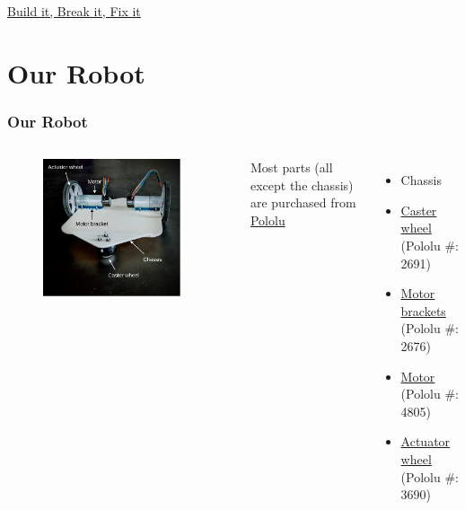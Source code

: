 \documentclass[12pt,letterpaper]{beamer}
\begin{document}
\begin{frame}{}
    \href{https://youtu.be/EezdinoG4mk}{Build it, Break it, Fix it}
    
\end{frame}

\section{Our Robot}

\begin{frame}
\frametitle{Our Robot}

\begin{columns}

\begin{figure}
    \includegraphics[width=0.9\textwidth]{3421bot}
\end{figure}

Most parts (all except the chassis) are purchased from \href{https://www.pololu.com/}{Pololu}
{\scriptsize 
\begin{itemize}
    \item Chassis
    \item \href{https://www.pololu.com/product/2691}{Caster wheel} (Pololu \#: 2691) 
    \item \href{https://www.pololu.com/product/2676}{Motor brackets} (Pololu \#: 2676)
    \item \href{https://www.pololu.com/product/4805}{Motor} (Pololu \#: 4805)
    \item \href{https://www.pololu.com/product/3690}{Actuator wheel} (Pololu \#: 3690)
\end{itemize}
}
\end{columns}
\end{frame}
\end{document}
